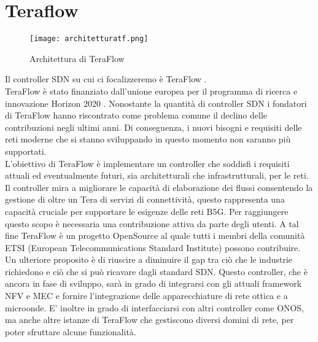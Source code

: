 \chapter{Teraflow}
\label{cap:teraflow}

\begin{figure}[h]
    \centering
   \texttt{[image: architetturatf.png]}
    \caption{Architettura di TeraFlow}
    \label{fig:tfs}
\end{figure}
Il controller SDN su cui ci focalizzeremo è TeraFlow \cite{TeraFlow}. 
\\TeraFlow è stato finanziato dall'unione europea per il programma di ricerca e innovazione Horizon 2020 \cite{Horizon}. 
Nonostante la quantità di controller SDN i fondatori di TeraFlow hanno riscontrato come problema comune il declino delle contribuzioni negli ultimi anni. 
Di conseguenza, i nuovi bisogni e requisiti delle reti moderne che si stanno sviluppando in questo momento non saranno più supportati.
\\L'obiettivo di TeraFlow è implementare un controller che soddisfi i requisiti attuali ed eventualmente futuri, sia architetturali che infrastrutturali, per le reti.
Il controller mira a migliorare le capacità di elaborazione dei flussi consentendo la gestione di oltre un Tera di servizi di connettività, questo rappresenta una capacità cruciale per supportare le esigenze delle reti B5G. 
Per raggiungere questo scopo è necessaria una contribuzione attiva 
da parte degli utenti. A tal fine TeraFlow è un progetto OpenSource 
al quale tutti i membri della comunità ETSI (European Telecommunications Standard Institute) \cite{etsi} possono contribuire. 
\\Un ulteriore proposito è di riuscire a diminuire il gap tra ciò che le industrie richiedono e ciò che si può ricavare dagli standard SDN.
Questo controller, che è ancora in fase di sviluppo, sarà in grado di integrarsi con gli attuali framework NFV e MEC e fornire l'integrazione delle 
apparecchiature di rete ottica e a microonde. E' inoltre in grado di interfacciarsi con altri controller come ONOS, ma anche altre istanze di TeraFlow che gestiscono diversi domini di rete, per poter sfruttare alcune funzionalità.
